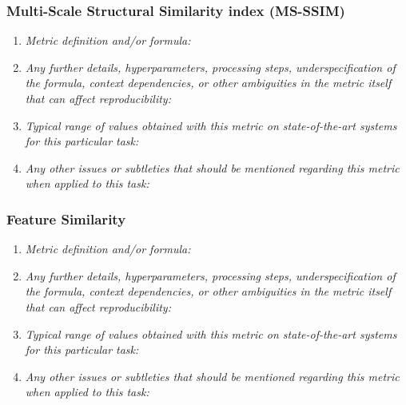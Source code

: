 \documentclass[a4paper,11pt]{article}
\begin{document}
        \subsubsection{Multi-Scale Structural Similarity index (MS-SSIM)}
            \begin{enumerate}[label=\alph*.]
                \item \textit{Metric definition and/or formula:}
                \bigskip
                \item \textit{Any further details, hyperparameters, processing steps, underspecification of the formula, context dependencies, or other ambiguities in the metric itself that can affect reproducibility:}
                \bigskip
                \item \textit{Typical range of values obtained with this metric on state-of-the-art systems for this particular task:}
                \bigskip
                \item \textit{Any other issues or subtleties that should be mentioned regarding this metric when applied to this task:}
                \bigskip
            \end{enumerate}
        \subsubsection{Feature Similarity}
            \begin{enumerate}[label=\alph*.]
                \item \textit{Metric definition and/or formula:}
                \bigskip
                \item \textit{Any further details, hyperparameters, processing steps, underspecification of the formula, context dependencies, or other ambiguities in the metric itself that can affect reproducibility:}
                \bigskip
                \item \textit{Typical range of values obtained with this metric on state-of-the-art systems for this particular task:}
                \bigskip
                \item \textit{Any other issues or subtleties that should be mentioned regarding this metric when applied to this task:}
                \bigskip
            \end{enumerate}
\end{document}
